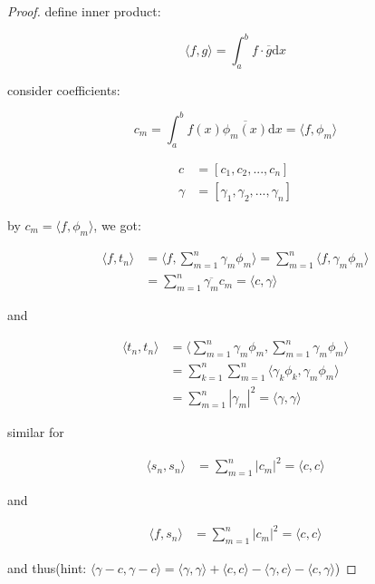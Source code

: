 \begin{proof}
    define inner product:

    \[
        \langle f, g \rangle = \int_a^b f \cdot \overline{g} \mathrm{d}x
    \]

    consider coefficients:

    \[
        c_m = \int_a^b f(x) \overline{\phi_m(x)} \mathrm{d}x = \langle f, \phi_m \rangle
    \]

    \begin{align*}
        c &= [c_1,c_2,...,c_n] \\
        \gamma &= [\gamma_1,\gamma_2,...,\gamma_n]
    \end{align*}

    by $c_m = \langle f , \phi_m \rangle$, we got:

    \begin{align*}
        \langle f, t_n \rangle &= \langle f, \sum_{m=1}^{n} \gamma_m \phi_m \rangle = \sum_{m=1}^{n}  \langle f, \gamma_m \phi_m \rangle \\
        &= \sum_{m=1}^{n}\overline{\gamma_m} c_m = \langle c, \gamma\rangle
    \end{align*}

    and


    \begin{align*}
        \langle t_n, t_n \rangle &= \langle \sum_{m=1}^{n} \gamma_m \phi_m, \sum_{m=1}^{n} \gamma_m \phi_m \rangle \\
        &= \sum_{k=1}^{n}\sum_{m=1}^{n}\langle  \gamma_k \phi_k,  \gamma_m \phi_m \rangle \\
        &= \sum_{m=1}^{n} | \gamma_m| ^2 = \langle \gamma, \gamma \rangle
    \end{align*}

    similar for


    \begin{align*}
        \langle s_n, s_n \rangle &= \sum_{m=1}^{n} \left| c_m\right|^2 = \langle c, c \rangle
    \end{align*}

    and

    \begin{align*}
        \langle f, s_n \rangle &= \sum_{m=1}^{n} \left| c_m\right|^2 = \langle c, c \rangle
    \end{align*}

    and thus(hint: $\langle \gamma -c , \gamma -c \rangle = \langle \gamma, \gamma \rangle + \langle c,c \rangle - \langle \gamma,c \rangle - \langle c, \gamma \rangle$)


\end{proof}
